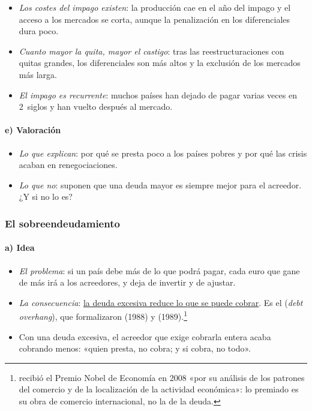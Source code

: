 \documentclass[11pt]{article}
\begin{document}
\begin{itemize}
\item \emph{Los costes del impago existen}: la producción cae en el año del impago y el acceso a los mercados se corta, aunque la penalización en los diferenciales dura poco\nocite{BorenszteinPanizza2009}.
\item \emph{Cuanto mayor la quita, mayor el castigo}: tras las reestructuraciones con quitas grandes, los diferenciales son más altos y la exclusión de los mercados más larga\nocite{CrucesTrebesch2013}.
\item \emph{El impago es recurrente}: muchos países han dejado de pagar varias veces en 2~siglos y han vuelto después al mercado\nocite{ReinhartRogoff2009This}.
\end{itemize}

\paragraph{e) Valoración}

\begin{itemize}
\item \emph{Lo que explican}: por qué se presta poco a los países pobres y por qué las crisis acaban en renegociaciones.
\item \emph{Lo que no}: suponen que una deuda mayor es siempre mejor para el acreedor. ¿Y si no lo es?
\end{itemize}

\subsubsection{El sobreendeudamiento}\label{sec:sobreendeudamiento}

\paragraph{a) Idea}

\begin{itemize}
\item \emph{El problema}: si un país debe más de lo que podrá pagar, cada euro que gane de más irá a los acreedores, y deja de invertir y de ajustar.
\item \emph{La consecuencia}: \uline{la deuda excesiva reduce lo que se puede cobrar}. Es el  (\emph{debt overhang}), que formalizaron  (1988) y  (1989)\nocite{Krugman1988Overhang,Sachs1989Overhang}.\footnote{ recibió el Premio Nobel de Economía en 2008 «por su análisis de los patrones del comercio y de la localización de la actividad económica»\nocite{Nobel2008Krugman}: lo premiado es su obra de comercio internacional, no la de la deuda.}
\item Con una deuda excesiva, el acreedor que exige cobrarla entera acaba cobrando menos: «quien presta, no cobra; y si cobra, no todo».
\end{itemize}
\end{document}
